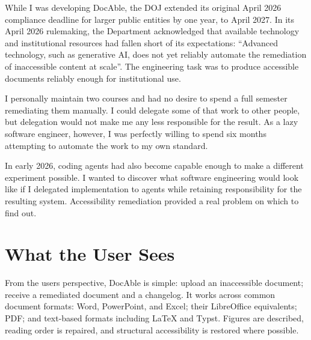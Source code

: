 
While I was developing DocAble, the DOJ extended its original April 2026 compliance deadline for larger public entities by one year, to April 2027. In its April 2026 rulemaking, the Department acknowledged that available technology and institutional resources had fallen short of its expectations: ``Advanced technology, such as generative AI, does not yet reliably automate the remediation of inaccessible content at scale''\citep{doj2026extension}. The engineering task was to produce accessible documents reliably enough for institutional use.

I personally maintain two courses and had no desire to spend a full semester remediating them manually. I could delegate some of that work to other people, but delegation would not make me any less responsible for the result. As a lazy software engineer, however, I was perfectly willing to spend six months attempting to automate the work to my own standard.


In early 2026, coding agents had also become capable enough to make a different experiment possible. I wanted to discover what software engineering would look like if I delegated implementation to agents while retaining responsibility for the resulting system. Accessibility remediation provided a real problem on which to find out.

\section{What the User Sees}\label{heading:what-the-user-sees}





From the user\textquotesingle s perspective, DocAble is simple: upload an inaccessible document; receive a remediated document and a changelog. It works across common document formats: Word, PowerPoint, and Excel; their LibreOffice equivalents; PDF; and text-based formats including LaTeX and Typst. Figures are described, reading order is repaired, and structural accessibility is restored where possible.

